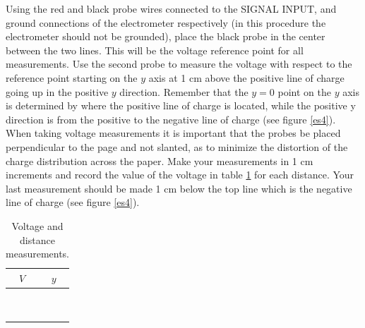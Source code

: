 {{{\noindent Using the red and black probe wires connected to the SIGNAL
INPUT, and ground connections of the electrometer respectively (in this
procedure the electrometer should not be grounded), place
the black probe in the center between the two lines. This
will be the voltage reference point for all measurements. Use
the second probe to measure the voltage with
respect to the reference point starting on the $y$ axis at 1 cm
above the positive line of charge going up in the positive $y$
direction.  Remember that the $y=0$ point on the $y$ axis is determined by
where the positive line of charge is located, while the positive y direction
is from the positive to the negative line of charge (see figure \ref{es4}).
When taking voltage measurements it is important that the probes be placed
perpendicular to the page and not slanted, as to minimize the distortion of
the charge distribution across the paper. Make your measurements in 1 cm
increments and record the value of the voltage in table \ref{tes1}
for each distance.  Your last measurement should be made 1 cm below the top
line which is the negative line of charge (see figure \ref{es4}). %

\begin{table}
\hspace{2cm}\begin{tabular}{|c|c|}\hline
\hspace{2cm} $V$ \hspace{2cm} & \hspace{2cm} $y$ \hspace{2cm} \\
\hline
\hspace{4cm} & \hspace{4cm} \\
\hline
\hspace{4cm} & \hspace{4cm} \\
\hline
\hspace{4cm} & \hspace{4cm} \\
\hline
\hspace{4cm} & \hspace{4cm} \\
\hline
\hspace{4cm} & \hspace{4cm} \\
\hline
\hspace{4cm} & \hspace{4cm} \\
\hline
\hspace{4cm} & \hspace{4cm} \\
\hline
\hspace{4cm} & \hspace{4cm} \\
\hline
\hspace{4cm} & \hspace{4cm} \\
\hline
\end{tabular}
\caption {Voltage and distance measurements.} \label{tes1}
\end{table}


}}}
